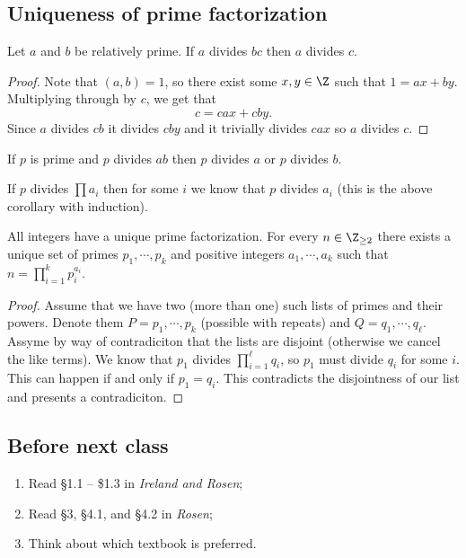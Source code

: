 \subsection*{Uniqueness of prime factorization}

\begin{lemma}
Let $a$ and $b$ be relatively prime. If $a$ divides $bc$ then $a$ divides $c$.
\end{lemma}

\begin{proof}
Note that $(a,b) = 1$, so there exist some $x,y \in \Z$ such that $1 = ax + by$. Multiplying through by $c$, we get that 
\[ c = cax + cby. \]
Since $a$ divides $cb$ it divides $cby$ and it trivially divides $cax$ so $a$ divides $c$.
\end{proof}

\begin{corollary}
If $p$ is prime and $p$ divides $ab$ then $p$ divides $a$ or $p$ divides $b$.
\end{corollary}

\begin{corollary}
If $p$ divides $\prod a_i$ then for some $i$ we know that $p$ divides $a_i$ (this is the above corollary with induction).
\end{corollary}

\begin{theorem}
All integers have a unique prime factorization. For every $n \in \Z_{\geq 2}$ there exists a unique set of primes $p_1, \cdots, p_k$ and positive integers $a_1 ,\cdots, a_k$ such that $n = \prod_{i=1}^k p_i^{a_i}$.
\end{theorem}

\begin{proof}
Assume that we have two (more than one) such lists of primes and their powers. Denote them $P = p_1, \cdots, p_k$ (possible with repeats) and $Q = q_1, \cdots, q_\ell$. Assyme by way of contradiciton that the lists are disjoint (otherwise we cancel the like terms). We know that $p_1$ divides $\prod_{i=1}^\ell q_i$, so $p_1$ must divide $q_i$ for some $i$. This can happen if and only if $p_1 = q_i$. This contradicts the disjointness of our list and presents a contradiciton.
\end{proof}

\subsection{Before next class}

\begin{enumerate}
\item Read \S1.1 -- \$1.3 in \emph{Ireland and Rosen};
\item Read \S3, \S4.1, and \S4.2 in \emph{Rosen};
\item Think about which textbook is preferred.
\end{enumerate}